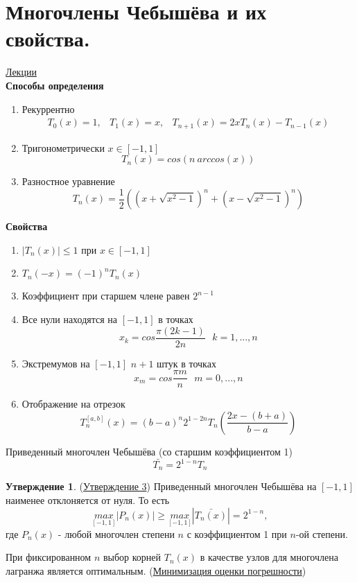 \documentclass[specialist, subf, href, colorlinks=true, 12pt, times, mtpro, final]{disser}
\theoremstyle{definition}
\newtheorem{state}{Утверждение}[section]
\begin{document}
\section {Многочлены Чебышёва и их свойства.}
	\hyperlink {lects.18}{Лекции}\\
	\textbf{Способы определения}
	\begin{enumerate}
		\item Рекуррентно 
			  $$
			  	\begin{array}{lcr}
			  		T_0(x) = 1, & T_1(x) = x, & T_{n+1}(x) = 2xT_n(x) - T_{n-1}(x)
			  	\end{array}
			  $$
		\item Тригонометрически $x\in[-1,1]$
			  $$
			  	T_n(x) = cos(n \ arccos(x))
			  $$
		\item Разностное уравнение
			  $$
			  	T_n(x) = \frac{1}{2}\left( \left( x + \sqrt{x^2 - 1} \right)^n + \left( x - \sqrt{x^2 - 1} \right)^n \right)
			  $$
	\end{enumerate}
	\textbf{Свойства}
	\begin{enumerate}
		\item $|T_n(x)| \le 1$ при $x \in [-1,1]$
		\item $T_n(-x) = (-1)^nT_n(x)$
		\item Коэффициент при старшем члене равен $2^{n - 1}$
		\item Все нули находятся на $[-1,1]$ в точках
			$$
				x_k = cos \frac{\pi (2k -1)}{2n} \ \ \ k = 1, ... , n
			$$
		\item Экстремумов на $[-1,1]$ $n+1$ штук в точках
			$$
				x_m = cos \frac{\pi m}{n} \ \ \ m = 0, ... , n
			$$ 
		\item Отображение на отрезок 
			$$
				T_n^{[a,b]} (x) = (b - a)^n 2^{1-2n} T_n \left( \frac{2x - (b+a)}{b-a} \right)
			$$
	\end{enumerate}

	Приведенный многочлен Чебышёва (со старшим коэффициентом 1)
	$$
		\bar {T_n} = 2^{1 - n}T_n
	$$
	
	\begin{state} (\hyperlink {lects.19}{Утверждение 3})
		Приведенный многочлен Чебышёва на $[-1,1]$ наименее отклоняется от нуля. То есть 
		$$
			\underset{[-1,1]}{max}|P_n(x)| \ge \underset{[-1,1]}{max} |\bar{T_n(x)}| = 2^{1-n},
		$$
		где $P_n(x)$ - любой многочлен степени $n$ с коэффициентом 1 при $n$-ой степени.
	\end{state}

	При фиксированном $n$ выбор корней $T_n(x)$ в качестве узлов для многочлена лагранжа является оптимальным.
	(\hyperlink {lects.20}{Минимизация оценки погрешности})
\end{document}
